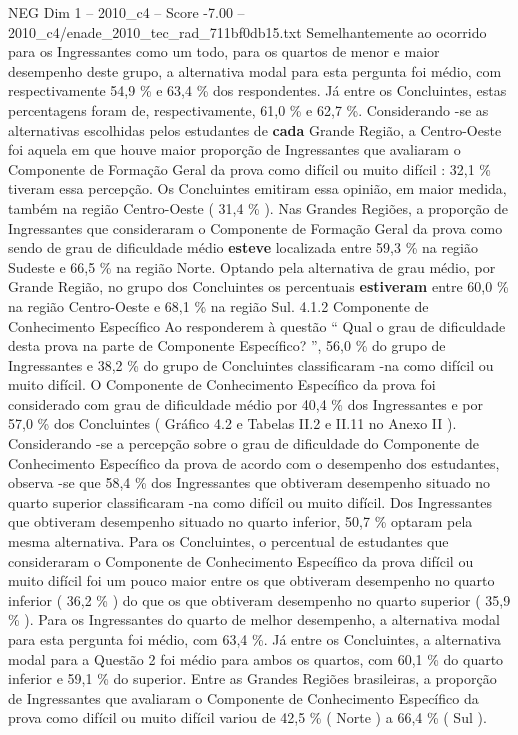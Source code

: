 \begin{textsample}{NEG Dim 1 – 2010\_c4 – Score -7.00 – 2010\_c4/enade\_2010\_tec\_rad\_711bf0db15.txt}
Semelhantemente ao ocorrido para os Ingressantes como um todo, para os quartos de menor e maior desempenho deste grupo, a alternativa modal para esta pergunta foi médio, com respectivamente 54,9 \% e 63,4 \% dos respondentes.
Já entre os Concluintes, estas percentagens foram de, respectivamente, 61,0 \% e 62,7 \%.
Considerando -se as alternativas escolhidas pelos estudantes de \textbf{cada} Grande Região, a Centro-Oeste foi aquela em que houve maior proporção de Ingressantes que avaliaram o Componente de Formação Geral da prova como difícil ou muito difícil : 32,1 \% tiveram essa percepção.
Os Concluintes emitiram essa opinião, em maior medida, também na região Centro-Oeste ( 31,4 \% ).
Nas Grandes Regiões, a proporção de Ingressantes que consideraram o Componente de Formação Geral da prova como sendo de grau de dificuldade médio \textbf{esteve} localizada entre 59,3 \% na região Sudeste e 66,5 \% na região Norte.
Optando pela alternativa de grau médio, por Grande Região, no grupo dos Concluintes os percentuais \textbf{estiveram} entre 60,0 \% na região Centro-Oeste e 68,1 \% na região Sul. 4.1.2 Componente de Conhecimento Específico Ao responderem à questão “ Qual o grau de dificuldade desta prova na parte de Componente Específico? ”, 56,0 \% do grupo de Ingressantes e 38,2 \% do grupo de Concluintes classificaram -na como difícil ou muito difícil.
O Componente de Conhecimento Específico da prova foi considerado com grau de dificuldade médio por 40,4 \% dos Ingressantes e por 57,0 \% dos Concluintes ( Gráfico 4.2 e Tabelas II.2 e II.11 no Anexo II ).
Considerando -se a percepção sobre o grau de dificuldade do Componente de Conhecimento Específico da prova de acordo com o desempenho dos estudantes, observa -se que 58,4 \% dos Ingressantes que obtiveram desempenho situado no quarto superior classificaram -na como difícil ou muito difícil.
Dos Ingressantes que obtiveram desempenho situado no quarto inferior, 50,7 \% optaram pela mesma alternativa.
Para os Concluintes, o percentual de estudantes que consideraram o Componente de Conhecimento Específico da prova difícil ou muito difícil foi um pouco maior entre os que obtiveram desempenho no quarto inferior ( 36,2 \% ) do que os que obtiveram desempenho no quarto superior ( 35,9 \% ).
Para os Ingressantes do quarto de melhor desempenho, a alternativa modal para esta pergunta foi médio, com 63,4 \%.
Já entre os Concluintes, a alternativa modal para a Questão 2 foi médio para ambos os quartos, com 60,1 \% do quarto inferior e 59,1 \% do superior.
Entre as Grandes Regiões brasileiras, a proporção de Ingressantes que avaliaram o Componente de Conhecimento Específico da prova como difícil ou muito difícil variou de 42,5 \% ( Norte ) a 66,4 \% ( Sul ).

\end{textsample}
